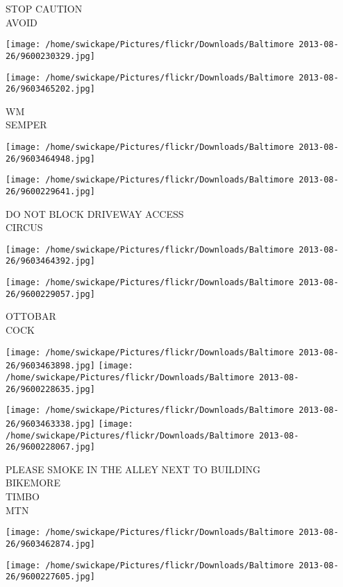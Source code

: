 \documentclass[10pt,letterpaper]{article}
\begin{document}
STOP CAUTION\\
AVOID
\pagebreak

\texttt{[image: /home/swickape/Pictures/flickr/Downloads/Baltimore 2013-08-26/9600230329.jpg]}

\vspace{0.25in}
\texttt{[image: /home/swickape/Pictures/flickr/Downloads/Baltimore 2013-08-26/9603465202.jpg]}

WM\\
SEMPER
\pagebreak

\texttt{[image: /home/swickape/Pictures/flickr/Downloads/Baltimore 2013-08-26/9603464948.jpg]}

\vspace{0.25in}
\texttt{[image: /home/swickape/Pictures/flickr/Downloads/Baltimore 2013-08-26/9600229641.jpg]}

DO NOT BLOCK DRIVEWAY ACCESS\\
CIRCUS
\pagebreak

\texttt{[image: /home/swickape/Pictures/flickr/Downloads/Baltimore 2013-08-26/9603464392.jpg]}

\vspace{0.25in}
\texttt{[image: /home/swickape/Pictures/flickr/Downloads/Baltimore 2013-08-26/9600229057.jpg]}

OTTOBAR\\
COCK
\pagebreak

\texttt{[image: /home/swickape/Pictures/flickr/Downloads/Baltimore 2013-08-26/9603463898.jpg]}
\texttt{[image: /home/swickape/Pictures/flickr/Downloads/Baltimore 2013-08-26/9600228635.jpg]}

\texttt{[image: /home/swickape/Pictures/flickr/Downloads/Baltimore 2013-08-26/9603463338.jpg]}
\texttt{[image: /home/swickape/Pictures/flickr/Downloads/Baltimore 2013-08-26/9600228067.jpg]}

PLEASE SMOKE IN THE ALLEY NEXT TO BUILDING\\
BIKEMORE\\
TIMBO\\
MTN
\pagebreak

\texttt{[image: /home/swickape/Pictures/flickr/Downloads/Baltimore 2013-08-26/9603462874.jpg]}

\vspace{0.25in}
\texttt{[image: /home/swickape/Pictures/flickr/Downloads/Baltimore 2013-08-26/9600227605.jpg]}
\end{document}
